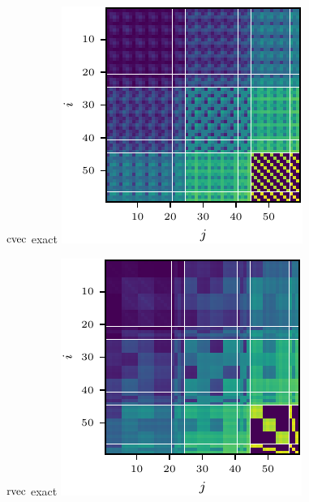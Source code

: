 \begin{figure}[!h]
\begin{minipage}[t]{0.49\linewidth}
  \end{minipage}
  \begin{minipage}[t]{0.49\linewidth}
    \centering
    $\operatorname{cvec}$ exact\vspace{1ex}
    \includegraphics[width=1.0\linewidth]{../kfs/plots/synthetic_cvec_ggn.pdf}
  \end{minipage}
  \hfill
  \begin{minipage}[t]{0.49\linewidth}
    \centering
    $\operatorname{rvec}$ exact\vspace{1ex}
    \includegraphics[width=1.0\linewidth]{../kfs/plots/synthetic_rvec_ggn.pdf}

\end{minipage}
\end{figure}
